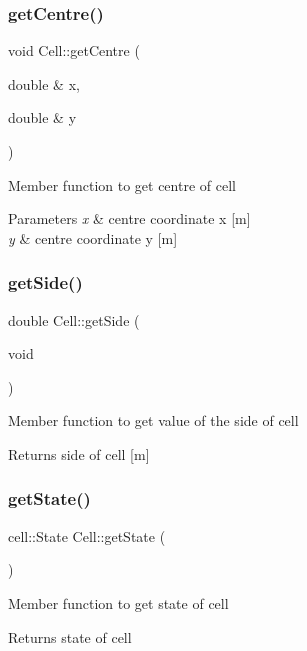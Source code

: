 \subsubsection{\texorpdfstring{get\+Centre()}{getCentre()}}
{\footnotesize\ttfamily void Cell\+::get\+Centre (\begin{DoxyParamCaption}\item[{double \&}]{x,  }\item[{double \&}]{y }\end{DoxyParamCaption})}

Member function to get centre of cell 
\begin{DoxyParams}{Parameters}
{\em x} & centre coordinate x \mbox{[}m\mbox{]} \\
\hline
{\em y} & centre coordinate y \mbox{[}m\mbox{]} \\
\hline
\end{DoxyParams}
\mbox{\label{classCell_a8369e6773b462215ea3c13d216621cb7}} 
\subsubsection{\texorpdfstring{get\+Side()}{getSide()}}
{\footnotesize\ttfamily double Cell\+::get\+Side (\begin{DoxyParamCaption}\item[{void}]{ }\end{DoxyParamCaption})}

Member function to get value of the side of cell \begin{DoxyReturn}{Returns}
side of cell \mbox{[}m\mbox{]} 
\end{DoxyReturn}
\mbox{\label{classCell_aba131004c3f0bade13ef1b72e5694885}} 
\subsubsection{\texorpdfstring{get\+State()}{getState()}}
{\footnotesize\ttfamily cell\+::\+State Cell\+::get\+State (\begin{DoxyParamCaption}{ }\end{DoxyParamCaption})}

Member function to get state of cell \begin{DoxyReturn}{Returns}
state of cell 
\end{DoxyReturn}
\mbox{\label{classCell_af02495b8e758ee82478134fd491f3e13}} 

